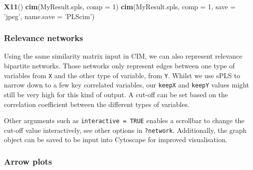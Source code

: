 \documentclass[]{book}
\newenvironment{Shaded}{\begin{snugshade}}{\end{snugshade}}
\newcommand{\CommentTok}[1]{\textcolor[rgb]{0.56,0.35,0.01}{\textit{#1}}}
\newcommand{\DataTypeTok}[1]{\textcolor[rgb]{0.13,0.29,0.53}{#1}}
\newcommand{\DecValTok}[1]{\textcolor[rgb]{0.00,0.00,0.81}{#1}}
\newcommand{\FloatTok}[1]{\textcolor[rgb]{0.00,0.00,0.81}{#1}}
\newcommand{\KeywordTok}[1]{\textcolor[rgb]{0.13,0.29,0.53}{\textbf{#1}}}
\newcommand{\NormalTok}[1]{#1}
\newcommand{\OperatorTok}[1]{\textcolor[rgb]{0.81,0.36,0.00}{\textbf{#1}}}
\newcommand{\StringTok}[1]{\textcolor[rgb]{0.31,0.60,0.02}{#1}}
\begin{document}
\begin{Shaded}
\begin{Highlighting}[]
\KeywordTok{X11}\NormalTok{()}
\KeywordTok{cim}\NormalTok{(MyResult.spls, }\DataTypeTok{comp =} \DecValTok{1}\NormalTok{)}
\KeywordTok{cim}\NormalTok{(MyResult.spls, }\DataTypeTok{comp =} \DecValTok{1}\NormalTok{, }\DataTypeTok{save =} \StringTok{'jpeg'}\NormalTok{, }\DataTypeTok{name.save =} \StringTok{'PLScim'}\NormalTok{)}
\end{Highlighting}
\end{Shaded}

\hypertarget{pls:network}{%
\subsubsection{Relevance networks}\label{pls:network}}

Using the same similarity matrix input in CIM, we can also represent relevance bipartite networks. Those networks only represent edges between one type of variables from \texttt{X} and the other type of variable, from \texttt{Y}. Whilst we use sPLS to narrow down to a few key correlated variables, our \texttt{keepX} and \texttt{keepY} values might still be very high for this kind of output. A cut-off can be set based on the correlation coefficient between the different types of variables.

Other arguments such as \texttt{interactive\ =\ TRUE} enables a scrollbar to change the cut-off value interactively, see other options in \texttt{?network}. Additionally, the graph object can be saved to be input into Cytoscape for improved visualisation.

\begin{Shaded}
\end{Shaded}

\hypertarget{arrow-plots}{%
\subsubsection{Arrow plots}\label{arrow-plots}}
\end{document}
